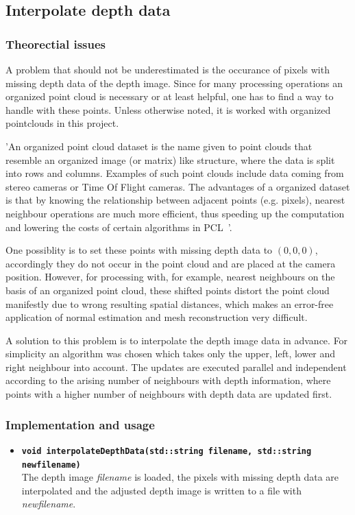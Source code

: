 \documentclass[paper=a4,11pt,bibliography=totoc]{scrartcl}
\begin{document}
\subsection{Interpolate depth data}
\subsubsection*{\color{darkgreen}Theorectial issues}
%
A problem that should not be underestimated is the occurance of pixels with missing depth data of the depth image. Since for many processing operations an organized point cloud is necessary or at least helpful, one has to find a way to handle with these points. Unless otherwise noted, it is worked with organized pointclouds in this project.
%
\begin{center}
\begin{minipage}[t]{0.8\textwidth}
\small\color{lightblue}\textsf{'An organized point cloud dataset is the name given to point clouds that resemble an organized image (or matrix) like structure, where the data is split into rows and columns. Examples of such point clouds include data coming from stereo cameras or Time Of Flight cameras. The advantages of a organized dataset is that by knowing the relationship between adjacent points (e.g. pixels), nearest neighbour operations are much more efficient, thus speeding up the computation and lowering the costs of certain algorithms in PCL~\cite{ordered}'.}
\end{minipage}
\end{center}
%
One possiblity is to set these points with missing depth data to $(0, 0, 0)$, accordingly they do not occur in the point cloud and are placed at the camera position. However, for processing with, for example, nearest neighbours on the basis of an organized point cloud, these shifted points distort the point cloud manifestly due to wrong resulting spatial distances, which makes an error-free application of normal estimation and mesh reconstruction very difficult.

A solution to this problem is to interpolate the depth image data in advance. For simplicity an algorithm was chosen which takes only the upper, left, lower and right neighbour into account. The updates are executed parallel and independent according to the arising number of neighbours with depth information, where points with a higher number of neighbours with depth data are updated first.
%
\subsubsection*{\color{darkred}Implementation and usage}
%
\begin{itemize}
\item \textbf{\texttt{void interpolateDepthData(std::string filename, std::string\\newfilename)}}\\
\textsf{The depth image \textit{filename} is loaded, the pixels with missing depth data are interpolated and the adjusted depth image is written to a file with \textit{newfilename}}.
\end{itemize}
%
\end{document}
